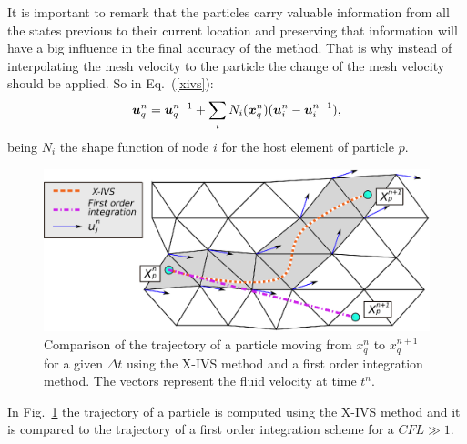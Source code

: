 It is important to remark that the particles carry valuable information from all the states previous to their current location and preserving that information will have a big influence in the final accuracy of the method. That is why instead of interpolating the mesh velocity to the particle the change of the mesh velocity should be applied. So in Eq.~(\ref{xivs}):
%
\begin{equation}\label{eq:partcor}
  \boldsymbol{u}_q^{n}=\boldsymbol{u}_q^{n-1}+\sum_{i}N_i(\boldsymbol{x}_q^n)(\boldsymbol{u}_i^n-\boldsymbol{u}_i^{n-1}),
\end{equation}
%
being $N_i$ the shape function of node $i$ for the host element of particle $p$.
\begin{figure}[htp] 
\centering 
\includegraphics[scale=.6]{./imgs/xivs.eps}
\caption{Comparison of the trajectory of a particle moving from $x_q^n$ to $x_q^{n+1}$ for a given $\Delta t$ using the X-IVS method and a first order integration method. The vectors represent the fluid velocity at time $t^n$.}
\label{fig:xivs}
\end{figure}
%
In Fig.~\ref{fig:xivs} the trajectory of a particle is computed using the X-IVS method and it is compared to the trajectory of a first order integration scheme for a $CFL \gg 1$. 

